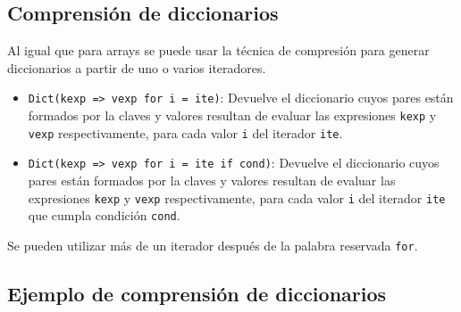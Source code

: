 \documentclass[
  letterpaper,
  DIV=11,
  numbers=noendperiod]{scrreprt}
\begin{document}
\hypertarget{comprensiuxf3n-de-diccionarios}{%
\subsection{Comprensión de
diccionarios}\label{comprensiuxf3n-de-diccionarios}}

Al igual que para arrays se puede usar la técnica de compresión para
generar diccionarios a partir de uno o varios iteradores.

\begin{itemize}
\item
  \texttt{Dict(kexp\ =\textgreater{}\ vexp\ for\ i\ =\ ite)}: Devuelve
  el diccionario cuyos pares están formados por la claves y valores
  resultan de evaluar las expresiones \texttt{kexp} y \texttt{vexp}
  respectivamente, para cada valor \texttt{i} del iterador \texttt{ite}.
\item
  \texttt{Dict(kexp\ =\textgreater{}\ vexp\ for\ i\ =\ ite\ if\ cond)}:
  Devuelve el diccionario cuyos pares están formados por la claves y
  valores resultan de evaluar las expresiones \texttt{kexp} y
  \texttt{vexp} respectivamente, para cada valor \texttt{i} del iterador
  \texttt{ite} que cumpla condición \texttt{cond}.
\end{itemize}

Se pueden utilizar más de un iterador después de la palabra reservada
\texttt{for}.

\hypertarget{ejemplo-de-comprensiuxf3n-de-diccionarios}{%
\subsection{Ejemplo de comprensión de
diccionarios}\label{ejemplo-de-comprensiuxf3n-de-diccionarios}}
\end{document}
